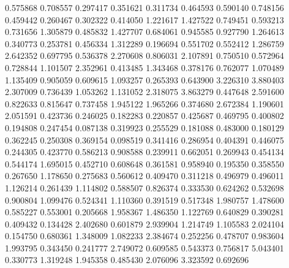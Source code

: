 0.575868
0.708557
0.297417
0.351621
0.311734
0.464593
0.590140
0.748156
0.459442
0.260467
0.302322
0.414050
1.221617
1.427522
0.749451
0.593213
0.731656
1.305879
0.485832
1.427707
0.684061
0.945585
0.927790
1.264613
0.340773
0.253781
0.456334
1.312289
0.196694
0.551702
0.552412
1.286759
2.642352
0.697795
0.536378
2.270608
0.806031
2.107891
0.750510
0.572964
0.728844
1.101507
2.352961
0.413485
1.343468
0.378176
0.762077
1.070489
1.135409
0.905059
0.609615
1.093257
0.265393
0.643900
3.226310
3.880403
2.307009
0.736439
1.053262
1.131052
2.318075
3.863279
0.447648
2.591600
0.822633
0.815647
0.737458
1.945122
1.965266
0.374680
2.672384
1.190601
2.051591
0.423736
0.246025
0.182283
0.220857
0.425687
0.469795
0.400802
0.194808
0.247454
0.087138
0.319923
0.255529
0.181088
0.483000
0.180129
0.362245
0.250308
0.369154
0.098519
0.341416
0.286954
0.404391
0.446075
0.244305
0.423770
0.586213
0.908588
0.239911
0.662051
0.269943
0.454134
0.544174
1.695015
0.452710
0.608648
0.361581
0.958940
0.195350
0.358550
0.267650
1.178650
0.275683
0.560612
0.409470
0.311218
0.496979
0.496011
1.126214
0.261439
1.114802
0.588507
0.826374
0.333530
0.624262
0.532698
0.900804
1.099476
0.524341
1.110360
0.391519
0.517348
1.980757
1.478600
0.585227
0.553001
0.205668
1.958367
1.486350
1.122769
0.640829
0.390281
0.409432
0.134428
2.402680
0.601879
2.939904
1.214749
1.105583
2.024104
0.154750
0.680361
1.348009
1.082233
2.384674
0.252256
0.478707
0.983604
1.993795
0.343450
0.241777
2.749072
0.609585
0.543373
0.756817
5.043401
0.330773
1.319248
1.945358
0.485430
2.076096
3.323592
0.692696

